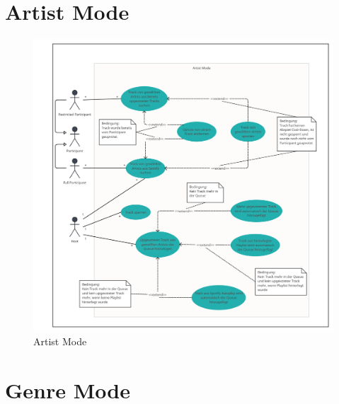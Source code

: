 \documentclass[oneside, ngerman]{sdqtechreport}
\begin{document}
\newpage

\section{Artist Mode}
\label{sec:Anwendungsfälle:Artist Mode}

\begin{figure}[h]
    \includegraphics[width = 16cm]{LATEX/Pflichtenheft/GraphicDesigns/Use Case Artist Mode.png}
    \caption{Artist Mode}
    \label{fig:Use Case Artist Mode}
\end{figure}

\newpage

\section{Genre Mode}
\label{sec:Anwendungsfälle:Genre Mode}
\end{document}
